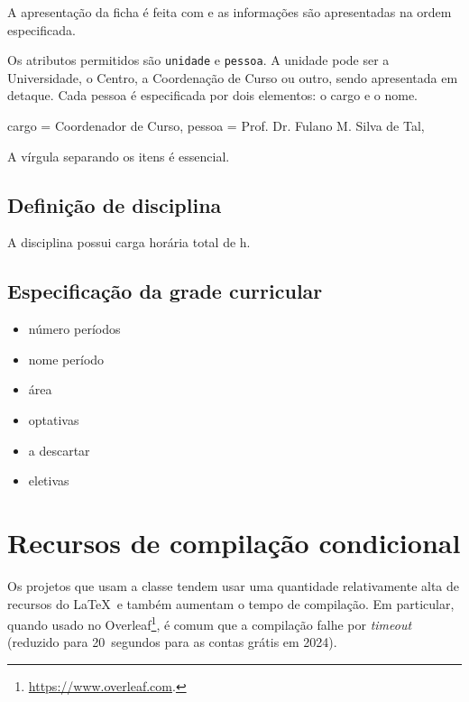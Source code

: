 \documentclass[a4paper, 11pt]{article}
\begin{document}
A apresentação da ficha é feita com  e as informações são apresentadas na ordem especificada.

Os atributos permitidos são \texttt{unidade} e \texttt{pessoa}. A unidade pode ser a Universidade, o Centro, a Coordenação de Curso ou outro, sendo apresentada em detaque. Cada pessoa é especificada por dois elementos: o cargo e o nome.

\begin{PDListing}
    cargo = {Coordenador de Curso},
    pessoa = {Prof. Dr. Fulano M. Silva de Tal},
\end{PDListing}

A vírgula separando os itens é essencial.

\subsection{Definição de disciplina}

\begin{PDExample}
    A disciplina  possui carga horária total de h.
\end{PDExample}

\subsection{Especificação da grade curricular}

\begin{itemize}
    \item número períodos
    \item nome período
    \item área
    \item optativas
    \item a descartar
    \item eletivas
\end{itemize}


\section{Recursos de compilação condicional}
%
%
Os projetos que usam a classe  tendem usar uma quantidade relativamente alta de recursos do \LaTeX\ e também aumentam o tempo de compilação. Em particular, quando usado no Overleaf\footnote{\url{https://www.overleaf.com}.}, é comum que a compilação falhe por \textit{timeout} (reduzido para 20~segundos para as contas grátis em 2024).
\end{document}
